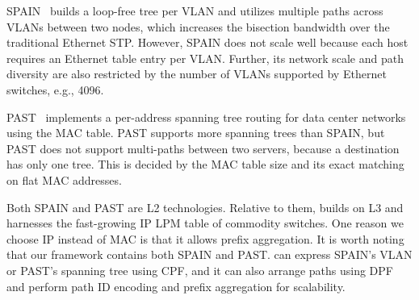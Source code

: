 


SPAIN~\cite{spain} builds a loop-free tree per VLAN and utilizes multiple paths across VLANs between two nodes, which increases the bisection bandwidth over the traditional Ethernet STP. However, SPAIN does not scale well because each host requires an Ethernet table entry per VLAN. Further, its network scale and path diversity are also restricted by the number of VLANs supported by Ethernet switches, e.g., 4096.

PAST~\cite{past} implements a per-address spanning tree routing for data center networks using the MAC table. PAST supports more spanning trees than SPAIN, but PAST does not support multi-paths between two servers, because a destination has only one tree. This is decided by the MAC table size and its exact matching on flat MAC addresses.

Both SPAIN and PAST are L2 technologies. Relative to them, \sys builds on L3 and harnesses the fast-growing IP LPM table of commodity switches. One reason we choose IP instead of MAC is that it allows prefix aggregation. It is worth noting that our \sys framework contains both SPAIN and PAST. \sys can express SPAIN's VLAN or PAST's spanning tree using CPF, and it can also arrange paths using DPF and perform path ID encoding and prefix aggregation for scalability.


